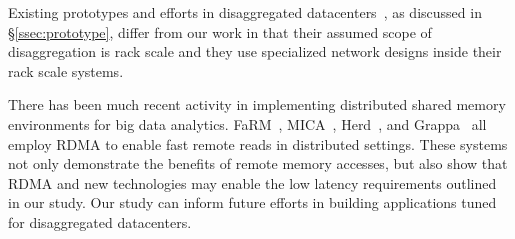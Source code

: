 {%
Existing prototypes and efforts in disaggregated datacenters~\cite{hptm, rsa,fdr,firebox,seamicro,catapult}, as discussed in \S\ref{ssec:prototype}, differ from our work in that their assumed scope of disaggregation is rack scale and they use specialized network designs inside their rack scale systems. 


There has been much recent activity in implementing distributed shared memory environments for big data analytics. FaRM~\cite{farm}, MICA~\cite{mica}, Herd~\cite{herd}, and Grappa~\cite{grappa} all employ RDMA to enable fast remote reads in distributed settings. These systems not only demonstrate the benefits of remote memory accesses, but also show that RDMA and new technologies may enable the low latency requirements outlined in our study. Our study can inform future efforts in building applications tuned for disaggregated datacenters.










}
